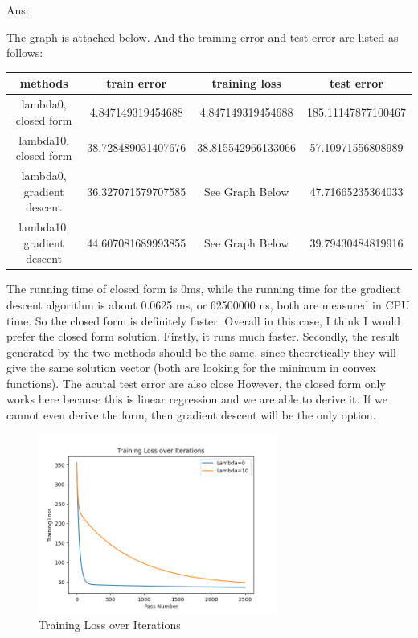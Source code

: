\documentclass[10pt,letter,notitlepage]{article}
\newcommand{\ans}[1]{{\color{orange}\textsf{Ans}: #1}}
\newcounter{exercise}
\begin{document}
\begin{exercise}
\begin{enumerate}
    \ans{} \\
    {\color{orange}
    The graph is attached below. And the training error and test error are listed as follows: \\
    \begin{tabular}{|c|c|c|c|}
    \hline methods&train error&training loss&test error\\
    \hline lambda0, closed form&4.847149319454688&4.847149319454688&185.11147877100467 \\
    \hline lambda10, closed form&38.728489031407676&38.815542966133066&57.10971556808989 \\
    \hline lambda0, gradient descent&36.327071579707585&See Graph Below&47.71665235364033 \\
    \hline lambda10, gradient descent&44.607081689993855&See Graph Below&39.79430484819916 \\
    \hline
    \end{tabular}
    

    The running time of closed form is 0ms, while the running time
    for the gradient descent algorithm is about 0.0625 ms, or 62500000 ns, both are measured in CPU time. 
    So the closed form is definitely faster.
    Overall in this case, I think I would prefer the closed form solution. Firstly, it runs much faster.
    Secondly, the result generated by the two methods should be the same, since theoretically they will give 
    the same solution vector (both are looking for the minimum in convex functions). 
    The acutal test error are also close
    However, the closed form only works here because this is linear regression and we are able to derive it. 
    If we cannot even derive the form, then gradient descent will be the only option. 
    }
    \begin{figure}[H]
    \centering
    \includegraphics[width=0.7\textwidth]{Exercise2.png}
    \caption{Training Loss over Iterations}
    \label{Fig.main3}
    \end{figure}


\end{enumerate}
\end{exercise}
\end{document}
